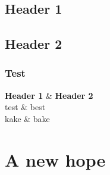 \documentclass[10pt,a4paper]{article}
\begin{document}
\thispagestyle{empty}



\tableofcontents
\newpage

\begin{multicols}{2}
\section{Header 1}
\lipsum
\subsection{Header 2}
\lipsum[1]

\subsubsection{Test}
\lipsum[1]

\secondarystats[wound=10, strain=20, soak=1, mdef=2, rdef=3]
\lipsum[1]
\end{multicols}
\lipsum[2]
\begin{multicols}{2}
\lipsum[1]
\begin{swtable} 
	\textbf{Header 1} & \textbf{Header 2} \\ 
	test & best \\
	kake & bake \\
\end{swtable}
\begin{swblackbox}
\lipsum[1]
\end{swblackbox}
\end{multicols}  

\section{A new hope}
\begin{multicols}{2}
\lipsum[2]  \lipsum[2]
\end{multicols}
\begin{swredbox}
\lipsum[2]
\end{swredbox}
\end{document}
